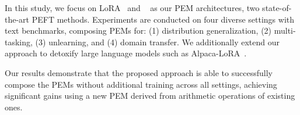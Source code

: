 In this study, we focus on LoRA~\citep{hu2021lora} and \ia~\citep{liu2022few} as our PEM architectures, two state-of-the-art PEFT methods. 
Experiments are conducted on four diverse settings with text benchmarks, composing PEMs for: 
(1) distribution generalization, (2) multi-tasking, (3) unlearning, and (4) domain transfer. We additionally extend our approach to detoxify large language models such as Alpaca-LoRA~\citep{alpacalora}.

Our results demonstrate that the proposed approach is able to successfully compose the PEMs without additional training across all settings, achieving significant gains using a new PEM derived from arithmetic operations of existing ones.
